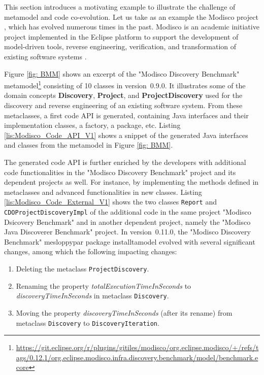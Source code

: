 This section introduces a motivating example to illustrate the challenge of metamodel and code co-evolution. 
Let us take as an example the Modisco project \cite{MDTModisco}, which has evolved numerous times in the past. Modisco is an academic initiative project implemented in the Eclipse platform to support the development of model-driven tools, reverse engineering, verification, and transformation of existing software systems \cite{bruneliere2010modisco,bruneliere2014modisco}.


Figure \ref{fig: BMM} shows an excerpt of the "Modisco Discovery Benchmark" metamodel\footnote{\url{https://git.eclipse.org/r/plugins/gitiles/modisco/org.eclipse.modisco/+/refs/tags/0.12.1/org.eclipse.modisco.infra.discovery.benchmark/model/benchmark.ecore}} consisting of 10 classes in version~0.9.0.
It illustrates some of the domain concepts \textbf{Discovery}, \textbf{Project}, and \textbf{ProjectDiscovery}  used for the discovery and reverse engineering of an existing software system. 
From these metaclasses, a first code API is generated, containing Java interfaces and their implementation classes, a factory, a package, etc. Listing \ref{lis:Modisco_Code_API_V1} shows a snippet of the generated Java interfaces and classes from the metamodel in Figure \ref{fig: BMM}. 

The generated code API is further enriched by the developers with additional code functionalities in the "Modisco Discovery Benchmark" project and its dependent projects as well.
For instance, by implementing the methods defined in metaclasses and advanced functionalities in new classes. Listing \ref{lis:Modisco_Code_External_V1} shows the two classes \texttt{Report} and \texttt{CDOProjectDiscoveryImpl} of the additional code in the same project "Modisco Dsicovery Benchmark" and in another dependent project, namely the "Modisco Java Discoverer Benchmark" project. 
In version~0.11.0, the "Modisco Discovery Benchmark" mesloppypar package installtamodel evolved with several significant changes, among which the following impacting changes:

\begin{enumerate}%
	
	\item Deleting the metaclass \texttt{ProjectDiscovery}. 
	
	\item Renaming the property \emph{totalExecutionTimeInSeconds} to \emph{discoveryTimeInSeconds} in metaclass \texttt{Discovery}. 
	
	\item Moving the property \emph{discoveryTimeInSeconds} (after its rename) from metaclass \texttt{Discovery} to \texttt{DiscoveryIteration}. 
	
\end{enumerate} 


